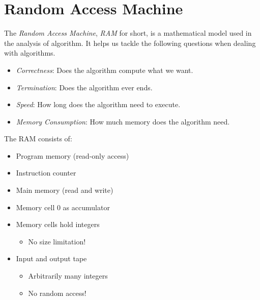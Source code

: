 \newpage
\section{Random Access Machine}

The \emph{Random Access Machine}, \emph{RAM} for short, is a mathematical model used in the analysis of algorithm. 
It helps us tackle the following questions when dealing with algorithms.

\begin{itemize}
   
    \item \emph{Correctness}: Does the algorithm compute what we want. 

    \item \emph{Termination}: Does the algorithm ever ends. 

    \item \emph{Speed}: How long does the algorithm need to execute.

    \item \emph{Memory Consumption}: How much memory does the algorithm need. 

\end{itemize}

The RAM consists of:

\begin{itemize}

    \item Program memory (read-only access)
    
    \item Instruction counter
    
    \item Main memory (read and write)
    
    \item Memory cell 0 as accumulator
    
    \item Memory cells hold integers
    
        \begin{itemize}
        
            \item No size limitation!
        
        \end{itemize}
        
    \item Input and output tape
    
        \begin{itemize}
        
            \item Arbitrarily many integers
            
            \item No random access!
        \end{itemize}

\end{itemize}

\vspace{\baselinekip}
